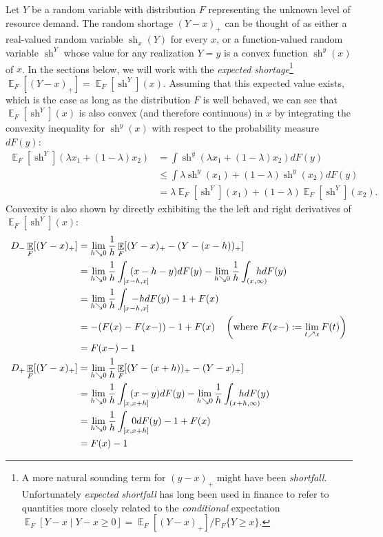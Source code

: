 \documentclass{article}\usepackage[]{graphicx}\usepackage[]{xcolor}
\DeclareMathOperator{\short}{sh}
\DeclareMathOperator{\Ex}{\mathbb{E}}
\begin{document}
Let $Y$ be a random variable with distribution $F$ representing the unknown level of resource demand. The random shortage $(Y-x)_{+}$ can be thought of as either a 
real-valued random variable $\short_x(Y)$ for every $x$, or a function-valued random variable $\short^Y$ whose value
for any realization $Y=y$ is a convex function $\short^y(x)$ of $x$.  In the sections below, we will work with the 
\emph{expected shortage}\footnote{A more natural sounding term for $(y-x)_{+}$ might have been \emph{shortfall}. Unfortunately 
\emph{expected shortfall} has long been used in finance to refer to quantities more 
closely related to the \emph{conditional} expectation $\Ex_F [Y-x \mid Y - x \geq 0] = \Ex_F [(Y-x)_{+}]/\mathbb{P}_F\{Y \geq x\}$.}
$\Ex_F [(Y-x)_{+}] = \Ex_F[\short^Y](x)$.
Assuming that this expected value exists, which is the case as long as the distribution $F$ is well behaved, we can see that $\Ex_F[\short^Y](x)$ is also convex (and therefore continuous) in $x$ by integrating the convexity inequality for
$\short^y(x)$ with respect to the probability measure $dF(y)$:
\begin{align}
	\Ex_F[\short^Y](\lambda x_1+(1-\lambda) x_2) &= \int \short^y(\lambda x_1+(1-\lambda) x_2)dF(y) \nonumber \\
	&\leq \int \lambda\short^y(x_1) +(1-\lambda) \short^y(x_2)dF(y) \nonumber \\
	&=\lambda\Ex_F[\short^Y](x_1) + (1-\lambda)\Ex_F[\short^Y](x_2). \label{eqn:convex-esf}
\end{align}
Convexity is also shown by directly exhibiting the the left and right derivatives of $\Ex_F[\short^Y](x)$:
\begin{align}
D_{-}\Ex_F [(Y-x)_{+}] &= \lim_{h \searrow 0}\frac{1}{h}\Ex_F [(Y - x)_{+} - (Y - (x - h))_{+}] \\
&= \lim_{h \searrow 0}\frac{1}{h}\int_{[x\mathrlap{-h, x]}} (x - h - y) dF(y) - 
\lim_{h \searrow 0}\frac{1}{h}\int_{(x\mathrlap{,\infty)}} h dF(y)  \\
&= \lim_{h \searrow 0}\frac{1}{h}\int_{[x\mathrlap{-h, x]}} - h dF(y) - 1 + F(x) \label{eqn:dsfllim} \\
&= -(F(x) - F(x-)) - 1 + F(x) \quad \left(\text{where } F(x-) := \lim_{t \nearrow x} F(t)\right)\\
&= F(x-) - 1  \label{eqn:dsfl} \\
D_{+}\Ex_F [(Y-x)_{+}] &= \lim_{h \searrow 0}\frac{1}{h}\Ex_F [(Y - (x + h))_{+} - (Y - x)_{+}] \\
&= \lim_{h \searrow 0}\frac{1}{h}\int_{[x\mathrlap{, x+h]}} (x - y) dF(y) - 
\lim_{h \searrow 0}\frac{1}{h}\int_{(x\mathrlap{+h,\infty)}} h dF(y)  \\
&= \lim_{h \searrow 0}\frac{1}{h}\int_{[x\mathrlap{, x+h]}} 0 dF(y) - 1 + F(x) \label{eqn:dsfrlim} \\
&= F(x) - 1 \label{eqn:dsfr}
\end{align}
\end{document}

